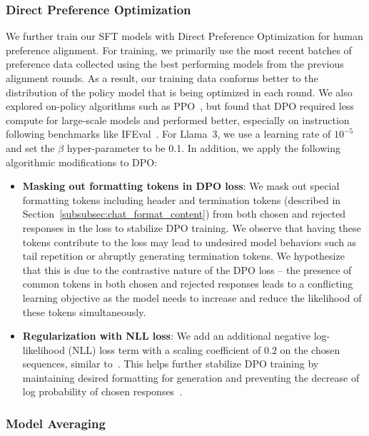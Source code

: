 \documentclass[dvipsnames]{fairmeta}
\begin{document}
\subsubsection{Direct Preference Optimization}
\label{subsubsec:postdpo}

We further train our SFT models with Direct Preference Optimization \citep[DPO;][]{rafailov2024direct} for human preference alignment. For training, we primarily use the most recent batches of preference data collected using the best performing models from the previous alignment rounds. As a result, our training data conforms better to the distribution of the policy model that is being optimized in each round. We also explored on-policy algorithms such as PPO~\citep{schulman2017proximal}, but found that DPO required less compute for large-scale models and performed better, especially on instruction following benchmarks like IFEval~\citep{zhou2023instruction}.
For Llama~3, we use a learning rate of $10^{-5}$ and set the $\beta$ hyper-parameter to be 0.1. In addition, we apply the following algorithmic modifications to DPO:

\begin{itemize}
    \item \textbf{Masking out formatting tokens in DPO loss}: We mask out special formatting tokens including header and termination tokens (described in Section~\ref{subsubsec:chat_format_content}) from both chosen and rejected responses in the loss to stabilize DPO training. We observe that having these tokens contribute to the loss may lead to undesired model behaviors such as tail repetition or abruptly generating termination tokens. We hypothesize that this is due to the contrastive nature of the DPO loss -- the presence of common tokens in both chosen and rejected responses leads to a conflicting learning objective as the model needs to increase and reduce the likelihood of these tokens simultaneously. 
    \item \textbf{Regularization with NLL loss}: We add an additional negative log-likelihood (NLL)  loss term with a scaling coefficient of $0.2$ on the chosen sequences, similar to~\citet{pang2024iterative}. This helps further stabilize DPO training by maintaining desired formatting for generation and preventing the decrease of log probability of chosen responses~\citep{pang2024iterative, pal2024smaug}. 
\end{itemize}

\subsubsection{Model Averaging}
\end{document}
